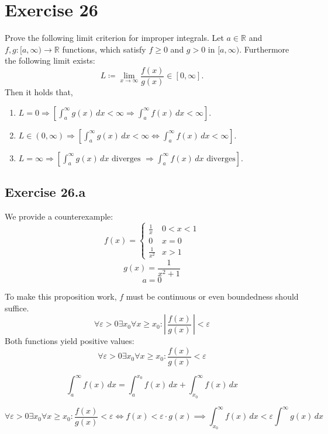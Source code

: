 \documentclass[a4paper]{article}
\theoremstyle{definition}
\newcommand\abs[1]{\left|\,#1\,\right|}
\begin{document}
\section{Exercise 26}
\begin{ex}
  Prove the following limit criterion for improper integrals.
  Let $a \in \mathbb R$ and $f,g: [a,\infty) \to \mathbb R$ functions,
  which satisfy $f \geq 0$ and $g > 0$ in $[a, \infty)$.
  Furthermore the following limit exists:
  \[ L \coloneqq \lim_{x\to\infty} \frac{f(x)}{g(x)} \in [0,\infty]. \]
  Then it holds that,
  \begin{enumerate}
    \item $L = 0 \Rightarrow \left[\int_a^\infty g(x) \, dx < \infty \Rightarrow \int_a^\infty f(x) \, dx < \infty \right]$.
    \item $L \in (0,\infty) \Rightarrow \left[
        \int_a^\infty g(x) \, dx < \infty \Leftrightarrow \int_a^\infty f(x) \, dx < \infty
      \right]$.
    \item $L = \infty \Rightarrow \left[\int_a^\infty g(x) \, dx \text{ diverges } \Rightarrow \int_a^\infty f(x) \, dx \text{ diverges}\right]$.
  \end{enumerate}
\end{ex}

\subsection{Exercise 26.a}
We provide a counterexample:
\[
  f(x) = \begin{cases}
    \frac1x & 0 < x < 1 \\
    0 & x = 0 \\
    \frac1{x^2} & x > 1
  \end{cases}
\] \[
  g(x) = \frac{1}{x^2 + 1}
\] \[
  a = 0
\]

To make this proposition work, $f$ must be continuous or even boundedness should suffice.
\[
  \forall \varepsilon > 0 \exists x_0 \forall x \geq x_0:
  \abs{\frac{f(x)}{g(x)}} < \varepsilon
\]
Both functions yield positive values:
\[
  \forall \varepsilon > 0 \exists x_0 \forall x \geq x_0:
  \frac{f(x)}{g(x)} < \varepsilon
\]

\[ \int_a^\infty f(x) \, dx = \int_a^{x_0} f(x) \, dx + \int_{x_0}^\infty f(x) \, dx \]

\[
  \forall \varepsilon > 0 \exists x_0 \forall x \geq x_0:
  \frac{f(x)}{g(x)} < \varepsilon
  \iff
  f(x) < \varepsilon \cdot g(x)
  \implies
  \int_{x_0}^\infty f(x) \, dx < \varepsilon \int^{\infty} g(x) \, dx
\]
\end{document}
